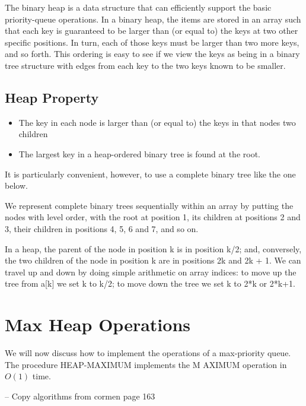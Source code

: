 \documentclass{article}
\begin{document}
The binary heap is a data structure that can efficiently support the basic priority-queue operations. In a binary heap, the items are stored in an array such that each key is guaranteed to be larger than (or equal to) the keys at two other specific positions. In turn, each of those keys must be larger than two more keys, and so forth. This ordering is easy to see if we view the keys as being in a binary tree structure with edges from each key to the two keys known to be smaller.

\subsection{Heap Property}
\begin{itemize}
  \item The key in each node is larger than (or equal to) the keys in that nodes two children
  \item The largest key in a heap-ordered binary tree is found at the root.
\end{itemize}


It is particularly convenient, however, to use a complete binary tree like the one below.


We represent complete binary trees sequentially within an array by putting the nodes with level order, with the root at position 1, its children at positions 2 and 3, their children in positions 4, 5, 6 and 7, and so on.

In a heap, the parent of the node in position k is in position k/2; and, conversely, the two children of the node in position k are in positions 2k and 2k + 1. We can travel up and down by doing simple arithmetic on array indices: to move up the tree from a[k] we set k to k/2; to move down the tree we set k to 2*k or 2*k+1.

\section{Max Heap Operations}
We will now discuss how to implement the operations of a max-priority queue. The procedure HEAP-MAXIMUM implements the M AXIMUM operation in $O(1)$ time.

-- Copy algorithms from cormen page 163
\end{document}
